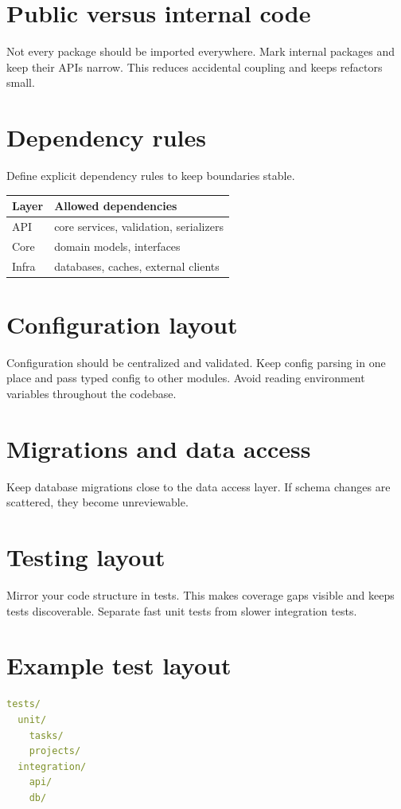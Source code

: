 \section{Public versus internal code}
Not every package should be imported everywhere.
Mark internal packages and keep their APIs narrow.
This reduces accidental coupling and keeps refactors small.

\section{Dependency rules}
Define explicit dependency rules to keep boundaries stable.

\begin{tabularx}{\textwidth}{@{}lX@{}}
\toprule
Layer & Allowed dependencies \\
\midrule
API & core services, validation, serializers \\
Core & domain models, interfaces \\
Infra & databases, caches, external clients \\
\bottomrule
\end{tabularx}

\section{Configuration layout}
Configuration should be centralized and validated.
Keep config parsing in one place and pass typed config to other modules.
Avoid reading environment variables throughout the codebase.

\section{Migrations and data access}
Keep database migrations close to the data access layer.
If schema changes are scattered, they become unreviewable.

\section{Testing layout}
Mirror your code structure in tests.
This makes coverage gaps visible and keeps tests discoverable.
Separate fast unit tests from slower integration tests.

\section{Example test layout}
\begin{lstlisting}[language=YAML]
tests/
  unit/
    tasks/
    projects/
  integration/
    api/
    db/
\end{lstlisting}

